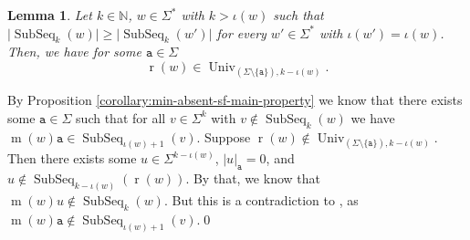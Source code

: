 \documentclass[10pt,a4paper]{amsart}
\makeatletter
\newcommand{\N}{\mathbb{N}}
\def\ta{\mathtt{a}}
\def\tb{\mathtt{b}}
\def\r{\operatorname{r}}
\def\m{\operatorname{m}}
\DeclareMathOperator{\arch}{ar}
\DeclareMathOperator{\alphabet}{alph}
\DeclareMathOperator\ScatFact{SubSeq}
\DeclareMathOperator{\Univ}{Univ}
\DeclareMathOperator{\inner}{in}
\newcommand{\todofpa}[1]{\todo[color=cyan!20,inline]{#1}}
\newcommand{\todoah}[1]{\todo[color=violet,inline, textcolor = white]{#1}}
\newif\ifpaper
\theoremstyle{plain}
\newtheorem{lemma}{Lemma}
\theoremstyle{definition}
\renewenvironment{proof}[1][\proofname]{\par
  \pushQED{}%
  \normalfont \topsep6\p@\@plus6\p@\relax
  \trivlist
  \item[\hskip\labelsep\itshape #1\@addpunct{.}]\ignorespaces
}{%
  \popQED\endtrivlist\@endpefalse
}
\makeatother
\begin{document}
\fi







\ifpaper
\else
\begin{lemma}\label{remark:min-absent-rest-k-iota-universal}
    Let $k\in\N$, $w\in\Sigma^{\ast}$ with $k>\iota(w)$ such that $\vert \ScatFact_k(w) \vert \geq \vert \ScatFact_k(w') \vert$ for every $w' \in \Sigma^*$ with $\iota(w') = \iota(w)$. 
    Then, we have for some $\ta\in\Sigma$ 
    \[
    \r(w) \in \Univ_{(\Sigma \setminus \{ \ta \}), k - \iota(w)}.
    \]
\end{lemma}

\begin{proof}
	By Proposition \ref{corollary:min-absent-sf-main-property} we know that there exists some $\ta\in\Sigma$ such that
	for all $v\in\Sigma^k$ with $v\notin\ScatFact_k(w)$ we have $\m(w)\ta\in\ScatFact_{\iota(w)+1}(v)$.
	Suppose $\r(w) \notin \Univ_{(\Sigma \setminus \{ \ta \}), k - \iota(w)}$.
	Then there exists some $u\in\Sigma^{k-\iota(w)}$, $|u|_\ta = 0$, and $u\notin\ScatFact_{k-\iota(w)}(\r(w))$.
	By that, we know that $\m(w)u\notin\ScatFact_k(w)$. But this is a contradiction to , as $\m(w)\ta\notin\ScatFact_{\iota(w)+1}(v)$.\qed
\end{proof}
\fi
\end{document}
